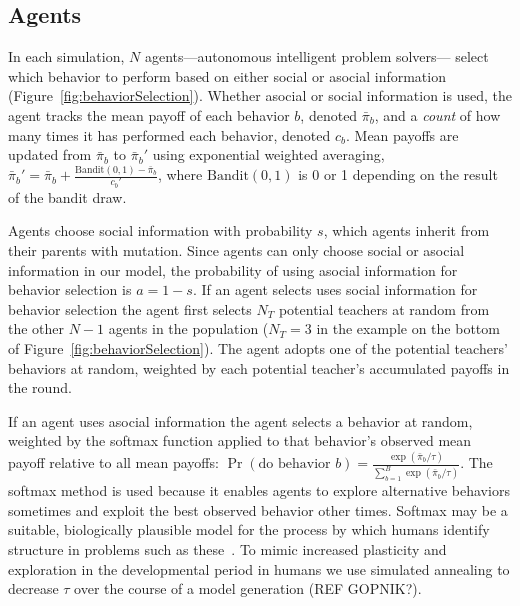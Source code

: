 \documentclass[10pt,letterpaper]{article}
\begin{document}
\subsection{Agents}

In each simulation, $N$ agents---autonomous intelligent problem solvers---
select which behavior to perform based on either social or asocial
information (Figure~\ref{fig:behaviorSelection}). 
Whether asocial or social information is used, the agent tracks 
the mean payoff of each behavior $b$, denoted $\bar\pi_b$, and a \emph{count} 
of how many times it has performed each behavior, denoted $c_b$. Mean payoffs
are updated from $\bar\pi_b$ to $\bar\pi_b'$ using exponential weighted averaging, 
$\bar\pi_b' = \bar\pi_b + \frac{\mathrm{Bandit(0, 1)} - \bar\pi_b}{c_b'}$, where
$\mathrm{Bandit(0, 1)}$ is 0 or 1 depending on the result of the bandit draw.

Agents choose social information with probability $s$, which agents inherit from their
parents with mutation. Since agents can only choose social or asocial information in
our model, the probability of using asocial information for behavior selection is
$a = 1 - s$. If an agent selects uses social information for behavior selection
the agent first selects $N_T$ potential teachers at random from the other
$N-1$ agents in the population ($N_T = 3$ in the example on the bottom of 
Figure~\ref{fig:behaviorSelection}). The agent adopts one of the potential 
teachers' behaviors at random, weighted by each potential teacher's accumulated
payoffs in the round. 

If an agent uses asocial information the agent selects a
behavior at random, weighted by the
softmax function applied to that behavior's observed mean payoff relative to 
all mean payoffs: 
$\Pr(\text{do behavior }b) = 
  \frac{\exp(\bar\pi_b / \tau) }{ 
\sum_{b=1}^B \exp(\bar\pi_b / \tau)}$.
The softmax method is used because it enables agents to explore alternative
behaviors sometimes and exploit the best observed behavior other times.
Softmax may be a suitable,
biologically plausible model for the process by which humans identify structure in
problems such as these~\cite{Schulz2019,Gershman2019}. To mimic increased plasticity
and exploration in the developmental
period in humans we use simulated annealing to decrease $\tau$ over the course of a
model generation (REF GOPNIK?).
\end{document}

